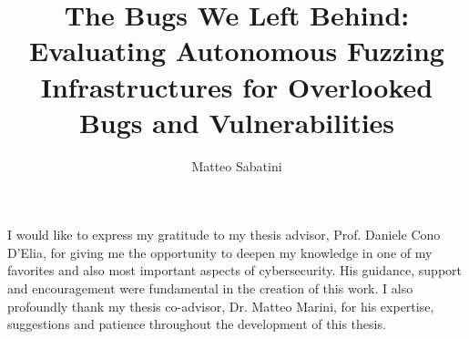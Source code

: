 \documentclass[binding=0.6cm, oneside]{sapthesis}%
\title{The Bugs We Left Behind: Evaluating Autonomous Fuzzing Infrastructures for Overlooked Bugs and Vulnerabilities}
\author{Matteo Sabatini}
\begin{document}
\frontmatter
\maketitle

\begin{acknowledgments}
I would like to express my gratitude to my thesis advisor, Prof. Daniele Cono D'Elia, for giving me the opportunity to deepen my knowledge in one of my favorites and also most important aspects of cybersecurity. His guidance, support and encouragement were fundamental in the creation of this work.
\newline
I also profoundly thank my thesis co-advisor, Dr. Matteo Marini, for his expertise, suggestions and patience throughout the development of this thesis.
\end{acknowledgments}
\end{document}

